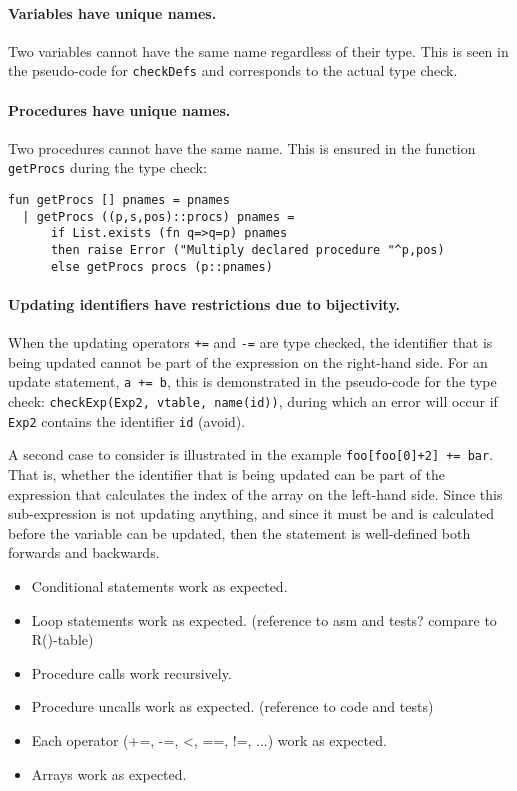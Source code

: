 \paragraph{Variables have unique names.} Two variables cannot have the same name
regardless of their type. This is seen in the pseudo-code for \verb+checkDefs+
and corresponds to the actual type check.

\paragraph{Procedures have unique names.} Two procedures cannot have the same
name. This is ensured in the function \verb+getProcs+ during the type check:

\begin{verbatim}
fun getProcs [] pnames = pnames
  | getProcs ((p,s,pos)::procs) pnames =
      if List.exists (fn q=>q=p) pnames
      then raise Error ("Multiply declared procedure "^p,pos)
      else getProcs procs (p::pnames)
\end{verbatim}

\paragraph{Updating identifiers have restrictions due to bijectivity.} When the
updating operators \verb!+=! and \verb!-=! are type checked, the identifier that
is being updated cannot be part of the expression on the right-hand side. For an
update statement, \verb!a += b!, this is demonstrated in the pseudo-code for the
type check: \verb+checkExp(Exp2, vtable, name(id))+, during which an error will
occur if \verb+Exp2+ contains the identifier \verb+id+ (avoid).

A second case to consider is illustrated in the example \verb!foo[foo[0]+2] += bar!.
That is, whether the identifier that is being updated can be part of the
expression that calculates the index of the array on the left-hand side. Since
this sub-expression is not updating anything, and since it must be and is
calculated before the variable can be updated, then the statement is
well-defined both forwards and backwards.

\begin{itemize}
\item Conditional statements work as expected.
\item Loop statements work as expected. (reference to asm and tests? compare to R()-table)
\item Procedure calls work recursively.
\item Procedure uncalls work as expected. (reference to code and tests)
\item Each operator (+=, -=, <, ==, !=, ...) work as expected.
\item Arrays work as expected.
\end{itemize}
